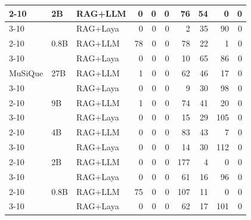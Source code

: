 \begin{tabular}{|l|l|l|r|r|r|r|r|r|r|}
\cline{2-10}
 & 2B & RAG+LLM & 0 & 0 & 0 & 76 & 54 & 0 & 0 \\ %
\cline{3-10}
 &  & RAG+Laya & 0 & 0 & 0 & 2 & 35 & 90 & 0 \\ %
\cline{2-10}
 & 0.8B & RAG+LLM & 78 & 0 & 0 & 78 & 22 & 1 & 0 \\ %
\cline{3-10}
 &  & RAG+Laya & 0 & 0 & 0 & 10 & 65 & 86 & 0 \\ %
\hline
MuSiQue & 27B & RAG+LLM & 1 & 0 & 0 & 62 & 46 & 17 & 0 \\ %
\cline{3-10}
 &  & RAG+Laya & 0 & 0 & 0 & 9 & 30 & 98 & 0 \\ %
\cline{2-10}
 & 9B & RAG+LLM & 1 & 0 & 0 & 74 & 41 & 20 & 0 \\ %
\cline{3-10}
 &  & RAG+Laya & 0 & 0 & 0 & 15 & 29 & 105 & 0 \\ %
\cline{2-10}
 & 4B & RAG+LLM & 0 & 0 & 0 & 83 & 43 & 7 & 0 \\ %
\cline{3-10}
 &  & RAG+Laya & 0 & 0 & 0 & 14 & 30 & 112 & 0 \\ %
\cline{2-10}
 & 2B & RAG+LLM & 0 & 0 & 0 & 177 & 4 & 0 & 0 \\ %
\cline{3-10}
 &  & RAG+Laya & 0 & 0 & 0 & 61 & 16 & 96 & 0 \\ %
\cline{2-10}
 & 0.8B & RAG+LLM & 75 & 0 & 0 & 107 & 11 & 0 & 0 \\ %
\cline{3-10}
 &  & RAG+Laya & 0 & 0 & 0 & 62 & 17 & 101 & 0 \\ %
\hline
\end{tabular}
